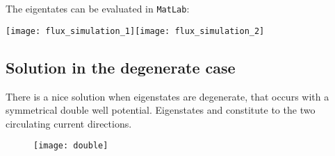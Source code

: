  The eigentates can be evaluated in \verb|MatLab|:
 \begin{center}
   \texttt{[image: flux\_simulation\_1]}\texttt{[image: flux\_simulation\_2]}
 \end{center}

 \newpage
 \subsection{Solution in the degenerate case}
 There is a  nice solution when eigenstates are  degenerate, that occurs
 with a  symmetrical double well potential.   Eigenstates 
 and  \iket{\psi(2\pi)}  constitute  to   the  two  circulating  current
 directions.

\begin{figure}[h]
  \centering \texttt{[image: double]}
\end{figure}

\noindent

